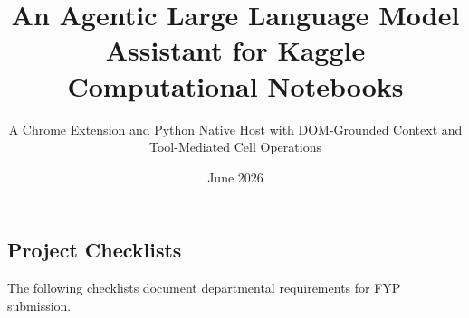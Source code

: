 \documentclass[11pt,a4paper,oneside]{book} %
\title{An Agentic Large Language Model Assistant for Kaggle Computational Notebooks}
\subtitle{A Chrome Extension and Python Native Host with DOM-Grounded Context and Tool-Mediated Cell Operations}
\date{June 2026}
\numberwithin{equation}{section}
\begin{document}
\maketitle









\tableofcontents
\listoftables
\listoffigures


\newpage



\resetpagenumbering










% 
% 
\printbibliography

\begin{appendix}
\chapter{Project Checklists}
The following checklists document departmental requirements for FYP submission.



\end{appendix}
\end{document}
